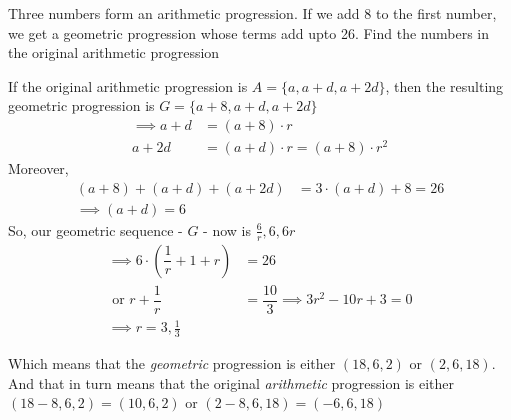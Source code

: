 

\question[5] Three numbers form an arithmetic progression. If we add 8 to the first number,
 we get a geometric progression whose terms add upto 26. Find the numbers in the original 
 arithmetic progression


\ifprintanswers
\fi 

\begin{solution}[\fullpage]
	If the original arithmetic progression is $A = \lbrace a, a + d, a+2d\rbrace$, then the
	resulting geometric progression is $G = \lbrace a + 8, a + d, a + 2d \rbrace$
	\begin{align}
		\implies a +d &= (a+8)\cdot r \\
		a + 2d &= (a+d)\cdot r = (a + 8)\cdot r^2 
	\end{align}
	Moreover, 
	\begin{align}
		(a+8) + (a+d)+(a+2d) &= 3\cdot(a+d) + 8 = 26 \\
		\implies (a+d) = 6
	\end{align}
	So, our geometric sequence - $G$ - now is $\frac{6}{r}, 6, 6r$
	\begin{align}
		\implies 6\cdot\left( \dfrac{1}{r} + 1 + r\right) &= 26 \\
		\text{ or } r + \dfrac{1}{r} &= \dfrac{10}{3} \implies 3r^2-10r+3 = 0 \\
		\implies r = 3, \frac{1}{3}
	\end{align}
	
	Which means that the \textit{geometric} progression is either $(18,6,2)$ or $(2,6,18)$.
	And that in turn means that the original \textit{arithmetic} progression is either
	$(18-8,6,2) = (10,6,2)$ or $(2-8,6,18) = (-6,6,18)$
\end{solution}
\ifprintanswers\begin{codex}\end{codex}\fi
